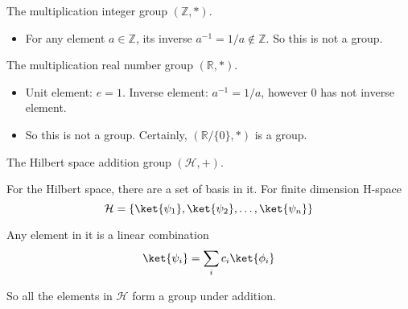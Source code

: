\begin{example}
    The multiplication integer group $(\mathbb Z,*)$.
    \begin{itemize}
        \item For any element $a\in\mathbb Z$, its inverse $a^{-1}=1/a\notin\mathbb Z$. So this is not a group.
    \end{itemize}
\end{example}

\begin{example}
    The multiplication real number group $(\mathbb R,*)$.
    \begin{itemize}
        \item Unit element: $e=1$. Inverse element: $a^{-1}=1/a$, however $0$ has not inverse element.
        \item So this is not a group. Certainly, $(\mathbb R/\{0\},*)$ is a group.
    \end{itemize}
\end{example}

\begin{example}
    The Hilbert space addition group $(\mathcal H,+)$.

    For the Hilbert space, there are a set of basis in it. For finite dimension H-space
    \[\mathcal H=\{\ket{\psi_1},\ket{\psi_2},\ldots,\ket{\psi_n}\}\]

    Any element in it is a linear combination
    \[\ket{\psi_i}=\sum_ic_i\ket{\phi_i}\]

    So all the elements in $\mathcal H$ form a group under addition.
\end{example}

